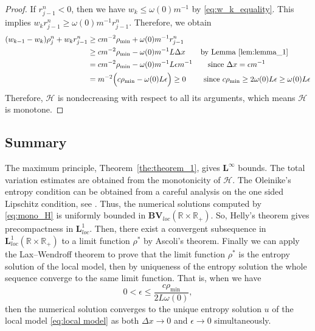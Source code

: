 \begin{proof}
    If $r_{j-1}^n < 0$, then we have $w_k \leq \omega(0)m^{-1}$ by \eqref{eq:w_k_equality}. This implies  $w_k r_{j-1}^n  \geq \omega(0)m^{-1} r_{j-1}^n  $. Therefore, we obtain
    \begin{align*}
        (w_{k-1}- w_k) \rho_j^n + w_k r_{j-1}^n & \geq cm^{-2}\rho_{\min} + \omega(0)m^{-1}r_{j-1}^n                                                                                               \\
                                                & \geq cm^{-2}\rho_{\min} -\omega(0)m^{-1}L\Delta x \qquad \text{by Lemma~\ref{lem:lemma_1}}\                                                      \\
                                                & = cm^{-2}\rho_{\min} -\omega(0)m^{-1}L\epsilon m^{-1} \qquad \text{since $\Delta x = \epsilon m^{-1}$ }                                          \\
                                                & = m^{-2}\Bigl(c\rho_{\min}- \omega(0)L\epsilon\Bigr) \geq 0 \qquad \text{ since $c\rho_{\min} \geq 2\omega(0)L\epsilon \geq \omega(0)L\epsilon$}
    \end{align*}
    Therefore, $\mathcal{H}$ is nondecreasing with respect to all its arguments, which means  $\mathcal{H}$ is monotone.
\end{proof}
\subsection*{Summary}
The maximum principle, Theorem~\ref{the:theorem_1}, gives $\mathbf{L^{\infty}}$ bounds. The total variation estimates are obtained from the monotonicity of $\mathcal{H}$. The Oleinike's entropy condition can be obtained from a careful analysis on the one sided Lipschitz condition, see \cite[LEMMA~4.3]{huangAsymptoticCompatibilityClass2024}. Thus, the numerical solutions computed by \eqref{eq:mono_H} is uniformly bounded in $\mathbf{BV}_{loc}(\mathbb{R} \times \mathbb{R}_{+})$. So, Helly's theorem gives precompactness in $\mathbf{L}_{loc}^{1}$. Then, there exist a convergent subsequence in $\mathbf{L}_{loc}^{1}(\mathbb{R} \times \mathbb{R}_{+})$ to a limit function $\rho^{*}$ by Ascoli's theorem. Finally we can apply the Lax--Wendroff theorem to prove that the limit function $\rho^{*}$ is the entropy solution of the local model, then by uniqueness of the entropy solution the whole sequence converge to the same limit function. That is, when we have
\[
    0 < \epsilon \leq \frac{c\rho_{\min}}{2L\omega(0)},
\]
then the numerical solution converges to the unique entropy solution $u$ of the local model \eqref{eq:local model} as both $\Delta x \rightarrow 0$ and $\epsilon \rightarrow 0$ simultaneously.

